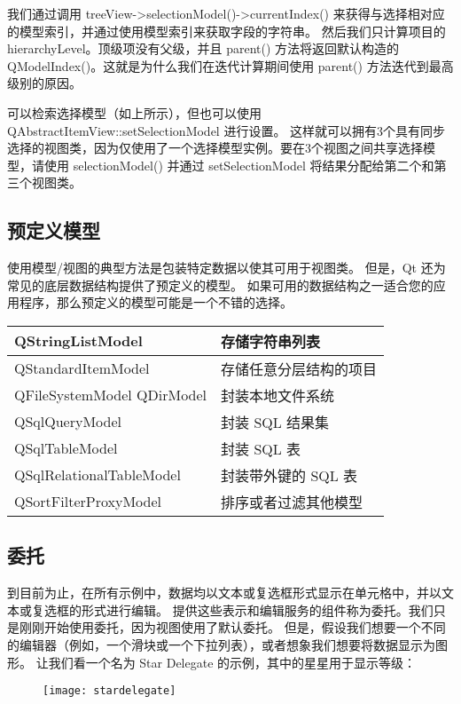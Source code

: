 我们通过调用 treeView->selectionModel()->currentIndex() 来获得与选择相对应的模型索引，并通过使用模型索引来获取字段的字符串。
然后我们只计算项目的hierarchyLevel。顶级项没有父级，并且 parent() 方法将返回默认构造的 QModelIndex()。这就是为什么我们在迭代计算期间使用 parent() 方法迭代到最高级别的原因。

可以检索选择模型（如上所示），但也可以使用 QAbstractItemView::setSelectionModel 进行设置。
这样就可以拥有3个具有同步选择的视图类，因为仅使用了一个选择模型实例。要在3个视图之间共享选择模型，请使用 selectionModel() 并通过 setSelectionModel 将结果分配给第二个和第三个视图类。

\subsection{预定义模型}

使用模型/视图的典型方法是包装特定数据以使其可用于视图类。
但是，Qt 还为常见的底层数据结构提供了预定义的模型。
如果可用的数据结构之一适合您的应用程序，那么预定义的模型可能是一个不错的选择。

\begin{longtable}{|l|l|}
\hline
QStringListModel &	存储字符串列表 \\ 
\hline
QStandardItemModel &	存储任意分层结构的项目\\
\hline
QFileSystemModel
QDirModel	 & 封装本地文件系统\\ 
\hline
QSqlQueryModel &	封装 SQL 结果集\\
\hline
QSqlTableModel	& 封装 SQL 表\\
\hline
QSqlRelationalTableModel &	封装带外键的 SQL 表 \\
\hline
QSortFilterProxyModel	& 排序或者过滤其他模型 \\
\hline
\end{longtable}

\subsection{委托}

到目前为止，在所有示例中，数据均以文本或复选框形式显示在单元格中，并以文本或复选框的形式进行编辑。
提供这些表示和编辑服务的组件称为委托。我们只是刚刚开始使用委托，因为视图使用了默认委托。
但是，假设我们想要一个不同的编辑器（例如，一个滑块或一个下拉列表），或者想象我们想要将数据显示为图形。
让我们看一个名为 Star Delegate 的示例，其中的星星用于显示等级：


\begin{figure}[hbt!]  
\texttt{[image: stardelegate]}
\end{figure}

